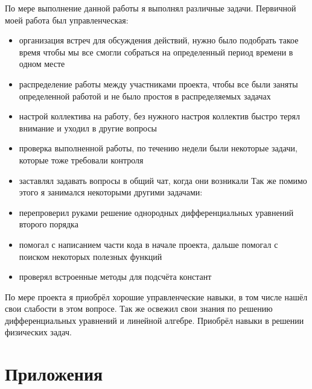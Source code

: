 \documentclass{article}
\begin{document}
По мере выполнение данной работы я выполнял различные задачи. Первичной моей работа был управленческая:
\begin{itemize}

\item организация встреч для обсуждения действий, нужно было подобрать такое время чтобы мы все смогли собраться на определенный период времени в одном месте
\item распределение работы между участниками проекта, чтобы все были заняты определенной работой и не было простоя в распределяемых задачах
\item настрой коллектива на работу, без нужного настроя коллектив быстро терял внимание и уходил в другие вопросы
\item проверка выполненной работы, по течению недели были некоторые задачи, которые тоже требовали контроля
\item заставлял задавать вопросы в общий чат, когда они возникали
Так же помимо этого я занимался некоторыми другими задачами:
\item перепроверил руками решение однородных дифференциальных уравнений второго порядка
\item помогал с написанием части кода в начале проекта, дальше помогал с поиском некоторых полезных функций
\item проверял встроенные методы для подсчёта констант
\end{itemize}
По мере проекта я приобрёл хорошие управленческие навыки, в том числе нашёл свои слабости в этом вопросе. Так же освежил свои знания по решению дифференциальных уравнений и линейной алгебре. Приобрёл навыки в решении физических задач.


\newpage




\newpage

\section*{Приложения}
\end{document}
